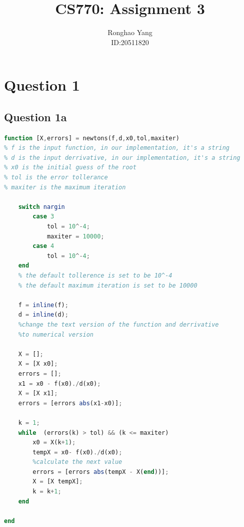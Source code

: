 \documentclass[11pt]{article} %
\title{CS770: Assignment 3}
\author{Ronghao Yang\\ID:20511820}
\begin{document}
\maketitle

\section{Question 1}
\subsection{Question 1a}
\begin{lstlisting}[language=Octave]
function [X,errors] = newtons(f,d,x0,tol,maxiter)
% f is the input function, in our implementation, it's a string
% d is the input derrivative, in our implementation, it's a string
% x0 is the initial guess of the root
% tol is the error tollerance
% maxiter is the maximum iteration

    switch nargin
        case 3
            tol = 10^-4;
            maxiter = 10000;
        case 4
            tol = 10^-4;
    end
    % the default tollerence is set to be 10^-4
    % the default maximum iteration is set to be 10000
    
    f = inline(f);
    d = inline(d);
    %change the text version of the function and derrivative
    %to numerical version
    
    X = [];
    X = [X x0];
    errors = [];
    x1 = x0 - f(x0)./d(x0);
    X = [X x1];
    errors = [errors abs(x1-x0)];
    
    k = 1;
    while  (errors(k) > tol) && (k <= maxiter)
        x0 = X(k+1);
        tempX = x0- f(x0)./d(x0);
        %calculate the next value
        errors = [errors abs(tempX - X(end))];
        X = [X tempX];
        k = k+1;
    end
        
end
\end{lstlisting}
\end{document}
